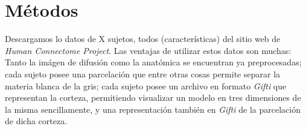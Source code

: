 \chapter{M\'etodos}

Descargamos lo datos de X sujetos, todos (caracter\'isticas) del sitio web 
de \textit{Human Connectome Project}. Las ventajas de utilizar estos datos son muchas:
Tanto la im\'agen de difusi\'on como la anat\'omica se encuentran ya preprocesadas;
cada sujeto posee una parcelaci\'on que entre otras cosas permite separar la materia
blanca de la gris; cada sujeto posee un archivo en formato \textit{Gifti} que
representan la corteza, permitiendo visualizar un modelo en tres dimensiones
de la misma sencillamente, y una representaci\'on tambi\'en en \textit{Gifti} 
de la parcelaci\'on de dicha corteza.



